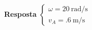 \textbf{Resposta}
$
\begin{cases}
\omega=\SI{20}{\radian/\second}\\
v_{A}=\SI{.6}{\meter/\second}
\end{cases}
$